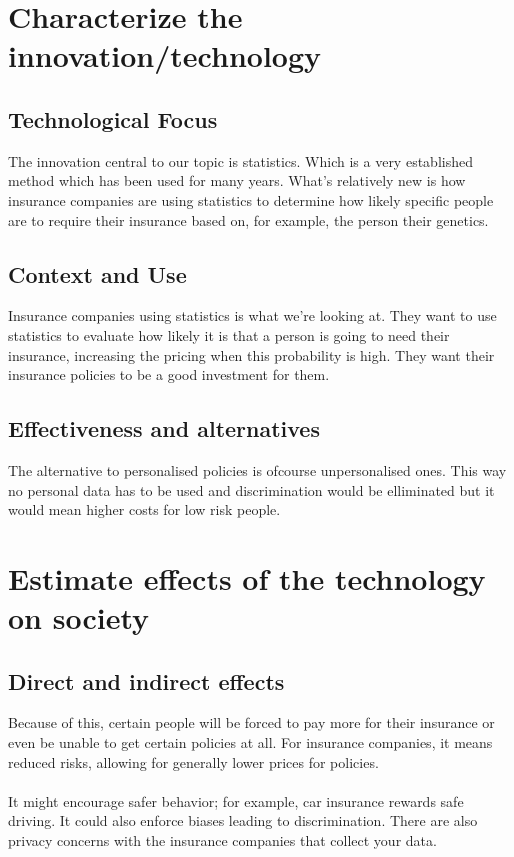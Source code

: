 \documentclass[a4paper, 12pt, table]{article}
\title{}
\author{}
\date{}
\numberwithin{equation}{section}
\begin{document}
\maketitle
\section{Characterize the innovation/technology}
\subsection{Technological Focus}
The innovation central to our topic is statistics. Which is a very established method which has been used for many years. What's relatively new is how insurance companies are using statistics to determine how likely specific people are to require their insurance based on, for example, the person their genetics.


\subsection{Context and Use}
Insurance companies using statistics is what we're looking at. They want to use statistics to evaluate how likely it is that a person is going to need their insurance, increasing the pricing when this probability is high. They want their insurance policies to be a good investment for them.

\subsection{Effectiveness and alternatives}
The alternative to personalised policies is ofcourse unpersonalised ones. This way no personal data has to be used and discrimination would be elliminated but it would mean higher costs for low risk people. 

\section{Estimate effects of the technology on society}
\subsection{Direct and indirect effects}
Because of this, certain people will be forced to pay more for their insurance or even be unable to get certain policies at all. For insurance companies, it means reduced risks, allowing for generally lower prices for policies.\\\\
It might encourage safer behavior; for example, car insurance rewards safe driving. It could also enforce biases leading to discrimination. There are also privacy concerns with the insurance companies that collect your data.
\end{document}
